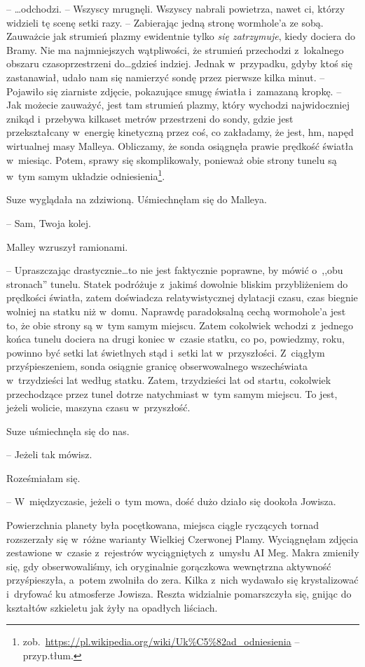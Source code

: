 \documentclass[oneside,polish,11pt,sfheadings]{mwbk}
\begin{document}
-- \ldots  odchodzi. -- Wszyscy mrugnęli. Wszyscy nabrali powietrza, nawet ci,
którzy widzieli tę scenę setki razy. -- Zabierając jedną stronę
wormhole'a ze sobą. Zauważcie jak strumień plazmy ewidentnie tylko
\textit{się zatrzymuje}, kiedy dociera do Bramy. Nie ma najmniejszych
wątpliwości, że strumień przechodzi z~lokalnego obszaru czasoprzestrzeni
do\ldots  gdzieś indziej. Jednak w~przypadku, gdyby ktoś się zastanawiał,
udało nam się namierzyć sondę przez pierwsze kilka minut. -- Pojawiło się
ziarniste zdjęcie, pokazujące smugę światła i~zamazaną kropkę. -- Jak
możecie zauważyć, jest tam strumień plazmy, który wychodzi najwidoczniej
znikąd i~przebywa kilkaset metrów przestrzeni do sondy, gdzie jest
przekształcany w~energię kinetyczną przez coś, co zakładamy, że jest,
hm, napęd wirtualnej masy Malleya. Obliczamy, że sonda osiągnęła prawie
prędkość światła w~miesiąc. Potem, sprawy się skomplikowały, ponieważ
obie strony tunelu są w~tym samym układzie
odniesienia\footnote{zob.~\url{https://pl.wikipedia.org/wiki/Uk\%C5\%82ad\_odniesienia} -- przyp.tłum.}.

Suze wyglądała na zdziwioną. Uśmiechnęłam się do Malleya. 

-- Sam, Twoja
kolej.

Malley wzruszył ramionami. 

-- Upraszczając drastycznie\ldots  to nie jest
faktycznie poprawne, by mówić o~,,obu stronach'' tunelu. Statek
podróżuje z~jakimś dowolnie bliskim przybliżeniem do prędkości światła,
zatem doświadcza relatywistycznej dylatacji czasu, czas biegnie wolniej
na statku niż w~domu. Naprawdę paradoksalną cechą wormohole'a jest to,
że obie strony są w~tym samym miejscu. Zatem cokolwiek wchodzi z~jednego
końca tunelu dociera na drugi koniec w~czasie statku, co po, powiedzmy,
roku, powinno być setki lat świetlnych stąd i~setki lat w~przyszłości. Z~ciągłym przyśpieszeniem, sonda osiągnie granicę obserwowalnego
wszechświata w~trzydzieści lat według statku. Zatem, trzydzieści lat od
startu, cokolwiek przechodzące przez tunel dotrze natychmiast w~tym
samym miejscu. To jest, jeżeli wolicie, maszyna czasu w~przyszłość.

Suze uśmiechnęła się do nas. 

-- Jeżeli tak mówisz.

Roześmiałam się. 

-- W~międzyczasie, jeżeli o~tym mowa, dość dużo działo
się dookoła Jowisza.

Powierzchnia planety była pocętkowana, miejsca ciągle ryczących tornad
rozszerzały się w~różne warianty Wielkiej Czerwonej Plamy. Wyciągnęłam
zdjęcia zestawione w~czasie z~rejestrów wyciągniętych z~umysłu AI Meg.
Makra zmieniły się, gdy obserwowaliśmy, ich oryginalnie gorączkowa
wewnętrzna aktywność przyśpieszyła, a~potem zwolniła do zera. Kilka z~nich wydawało się krystalizować i~dryfować ku atmosferze Jowisza. Reszta
widzialnie pomarszczyła się, gnijąc do kształtów szkieletu jak żyły na
opadłych liściach.
\end{document}
